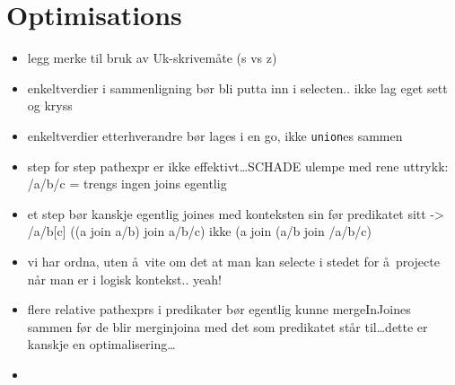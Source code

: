 \section{Optimisations}
\label{sect:discussion:optimisations}
\begin{itemize}
  \item legg merke til bruk av Uk-skrivem\aa te (s vs z)
  \item enkeltverdier i sammenligning b\o r bli putta inn i selecten.. ikke lag
  eget sett og kryss
  \item enkeltverdier etterhverandre b\o r lages i en go, ikke \texttt{union}es
  sammen
  \item step for step pathexpr er ikke effektivt\ldots SCHADE ulempe med rene uttrykk: /a/b/c = trengs ingen
  joins egentlig
  \item et step b\o r kanskje egentlig joines med konteksten sin f\o r predikatet sitt -> /a/b[c] ((a join a/b)
  join a/b/c) ikke (a join (a/b join /a/b/c)
  \item vi har ordna, uten \aa~vite om det at man kan selecte i stedet for \aa~projecte n\aa r man er i logisk
  kontekst.. yeah!
  \item flere relative pathexprs i predikater b\o r egentlig kunne mergeInJoines sammen f\o r de blir merginjoina
	med det som predikatet st\aa r til\ldots dette er kanskje en optimalisering\ldots
  \item 
\end{itemize}